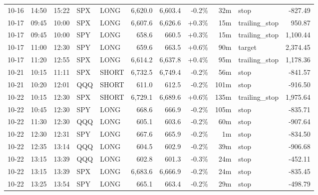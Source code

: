 \documentclass[11pt,a4paper,twoside]{article}
\begin{document}
\begin{center}
\begin{longtable}{>{\color{txtmain}}l l l l l r r r r >{\color{txtmain}}l r}
10-16 & 14:50 & 15:22 & SPX & LONG & 6,620.0 & 6,603.4 & \textcolor{lossred}{-0.2\%} & 32m & stop & \textcolor{lossred}{-827.49} \\
10-17 & 09:45 & 10:00 & SPX & LONG & 6,607.6 & 6,626.6 & \textcolor{wingreen}{+0.3\%} & 15m & trailing\_stop & \textcolor{wingreen}{950.87} \\
10-17 & 09:45 & 10:00 & SPY & LONG & 658.6 & 660.5 & \textcolor{wingreen}{+0.3\%} & 15m & trailing\_stop & \textcolor{wingreen}{1,100.44} \\
10-17 & 11:00 & 12:30 & SPY & LONG & 659.6 & 663.5 & \textcolor{wingreen}{+0.6\%} & 90m & target & \textcolor{wingreen}{2,374.45} \\
10-17 & 11:20 & 12:55 & SPX & LONG & 6,614.2 & 6,637.8 & \textcolor{wingreen}{+0.4\%} & 95m & trailing\_stop & \textcolor{wingreen}{1,178.36} \\
10-21 & 10:15 & 11:11 & SPX & SHORT & 6,732.5 & 6,749.4 & \textcolor{lossred}{-0.2\%} & 56m & stop & \textcolor{lossred}{-841.57} \\
10-21 & 10:20 & 12:01 & QQQ & SHORT & 611.0 & 612.5 & \textcolor{lossred}{-0.2\%} & 101m & stop & \textcolor{lossred}{-916.50} \\
10-22 & 10:15 & 12:30 & SPX & SHORT & 6,729.1 & 6,689.6 & \textcolor{wingreen}{+0.6\%} & 135m & trailing\_stop & \textcolor{wingreen}{1,975.64} \\
10-22 & 10:45 & 12:30 & SPY & LONG & 668.6 & 666.9 & \textcolor{lossred}{-0.2\%} & 105m & stop & \textcolor{lossred}{-835.71} \\
10-22 & 11:30 & 12:30 & QQQ & LONG & 605.1 & 603.6 & \textcolor{lossred}{-0.2\%} & 60m & stop & \textcolor{lossred}{-907.64} \\
10-22 & 12:30 & 12:31 & SPY & LONG & 667.6 & 665.9 & \textcolor{lossred}{-0.2\%} & 1m & stop & \textcolor{lossred}{-834.50} \\
10-22 & 12:35 & 13:14 & QQQ & LONG & 604.5 & 602.9 & \textcolor{lossred}{-0.2\%} & 39m & stop & \textcolor{lossred}{-906.68} \\
10-22 & 13:15 & 13:39 & QQQ & LONG & 602.8 & 601.3 & \textcolor{lossred}{-0.3\%} & 24m & stop & \textcolor{lossred}{-452.11} \\
10-22 & 13:15 & 13:39 & SPX & LONG & 6,683.6 & 6,666.9 & \textcolor{lossred}{-0.2\%} & 24m & stop & \textcolor{lossred}{-835.45} \\
10-22 & 13:25 & 13:54 & SPY & LONG & 665.1 & 663.4 & \textcolor{lossred}{-0.2\%} & 29m & stop & \textcolor{lossred}{-498.79} \\

\end{longtable}
\end{center}
\end{document}
